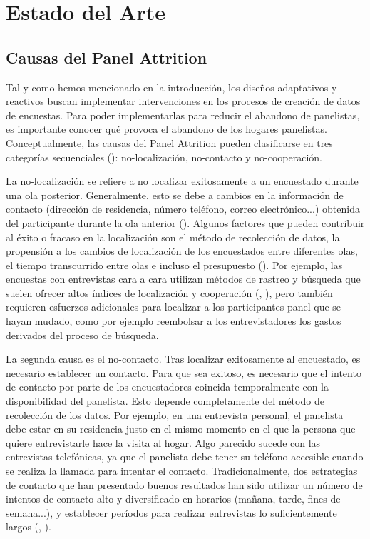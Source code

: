 \chapter{Estado del Arte}
\label{chapter:attrition}
\section{Causas del Panel Attrition}
\label{section:causes_attrition}

Tal y como hemos mencionado en la introducción, los diseños adaptativos y reactivos buscan implementar intervenciones en los procesos de creación de datos de encuestas. Para poder implementarlas para reducir el abandono de panelistas, es importante conocer qué provoca el abandono de los hogares panelistas. Conceptualmente, las causas del Panel Attrition pueden clasificarse en tres categorías secuenciales (\cite{lepkowski2002nonresponse}): no-localización, no-contacto y no-cooperación.

La no-localización se refiere a no localizar exitosamente a un encuestado durante una ola posterior. Generalmente, esto se debe a cambios en la información de contacto (dirección de residencia, número teléfono, correo electrónico...) obtenida del participante durante la ola anterior (\cite{couper2009keeping}). Algunos factores que pueden contribuir al éxito o fracaso en la localización son el método de recolección de datos, la propensión a los cambios de localización de los encuestados entre diferentes olas, el tiempo transcurrido entre olas e incluso el presupuesto (\cite{lynn2009methods}). Por ejemplo, las encuestas con entrevistas cara a cara utilizan métodos de rastreo y búsqueda que suelen ofrecer altos índices de localización y cooperación (\cite{de2005mix}, \cite{couper2009keeping}), pero también requieren esfuerzos adicionales para localizar a los participantes panel que se hayan mudado, como por ejemplo reembolsar a los entrevistadores los gastos derivados del proceso de búsqueda.

La segunda causa es el no-contacto. Tras localizar exitosamente al encuestado, es necesario establecer un contacto. Para que sea exitoso, es necesario que el intento de contacto por parte de los encuestadores coincida temporalmente con la disponibilidad del panelista. Esto depende completamente del método de recolección de los datos. Por ejemplo, en una entrevista personal, el panelista debe estar en su residencia justo en el mismo momento en el que la persona que quiere entrevistarle hace la visita al hogar. Algo parecido sucede con las entrevistas telefónicas, ya que el panelista debe tener su teléfono accesible cuando se realiza la llamada para intentar el contacto. Tradicionalmente, dos estrategias de contacto que han presentado buenos resultados han sido utilizar un número de intentos de contacto alto y diversificado en horarios (mañana, tarde, fines de semana...), y establecer períodos para realizar entrevistas lo suficientemente largos (\cite{nicoletti2005survey}, \cite{watson2009identifying}).

